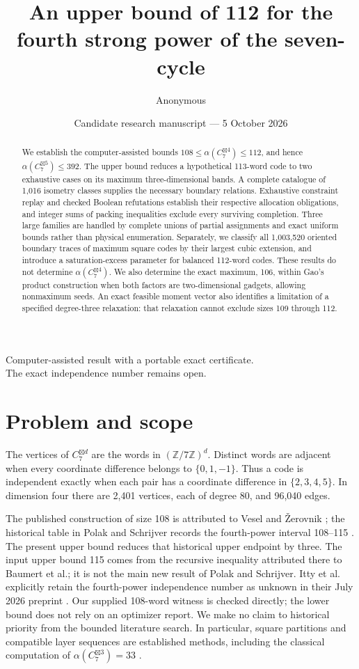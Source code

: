 \documentclass[11pt]{article}
\title{An upper bound of 112 for the fourth strong power of the seven-cycle}
\author{Anonymous}
\date{Candidate research manuscript --- 5 October 2026}
\theoremstyle{definition}
\newcommand{\Z}{\mathbb Z}
\newcommand{\G}[1]{C_7^{\boxtimes #1}}
\begin{document}
\maketitle
\begin{center}\small
Computer-assisted result with a portable exact certificate.\\
The exact independence number remains open.
\end{center}

\begin{abstract}
We establish the computer-assisted bounds
$108\leq\alpha(\G4)\leq112$, and hence $\alpha(\G5)\leq392$.
The upper bound reduces a hypothetical 113-word code to two exhaustive cases
on its maximum three-dimensional bands. A complete catalogue of 1,016
isometry classes supplies the necessary boundary relations. Exhaustive
constraint replay and checked Boolean refutations establish their respective
allocation obligations, and integer sums of
packing inequalities exclude every surviving completion. Three large
families are handled by complete unions of partial assignments and exact
uniform bounds rather than physical enumeration. Separately, we classify
all 1,003,520 oriented boundary traces of maximum square codes by their
largest cubic extension, and introduce a saturation-excess parameter for
balanced 112-word codes. These results do not determine $\alpha(\G4)$.
We also determine the exact maximum, 106, within Gao's product construction
when both factors are two-dimensional gadgets, allowing nonmaximum seeds.
An exact feasible moment vector also identifies a limitation of a specified
degree-three relaxation: that relaxation cannot exclude sizes 109 through 112.
\end{abstract}

\section{Problem and scope}
The vertices of $\G d$ are the words in $(\Z/7\Z)^d$. Distinct words are
adjacent when every coordinate difference belongs to $\{0,1,-1\}$.
Thus a code is independent exactly when each pair has a coordinate
difference in $\{2,3,4,5\}$. In dimension four there are 2,401 vertices,
each of degree 80, and 96,040 edges.

The published construction of size 108 is attributed to Vesel and
\v{Z}erovnik \cite{vesel}; the historical table in Polak and Schrijver records the
fourth-power interval 108--115 \cite{polak}. The present upper bound
reduces that historical upper endpoint by three. The input upper bound 115
comes from the recursive inequality attributed there to Baumert et al.;
it is not the main new result of Polak and Schrijver. Itty et al. explicitly retain
the fourth-power independence number as unknown in their July 2026
preprint \cite{itty}. Our supplied 108-word witness is checked directly;
the lower bound does not rely on an optimizer report. We make no claim to
historical priority from the bounded literature search. In particular,
square partitions and compatible layer sequences are established methods,
including the classical computation of $\alpha(\G3)=33$ \cite{baumert}.
\end{document}
